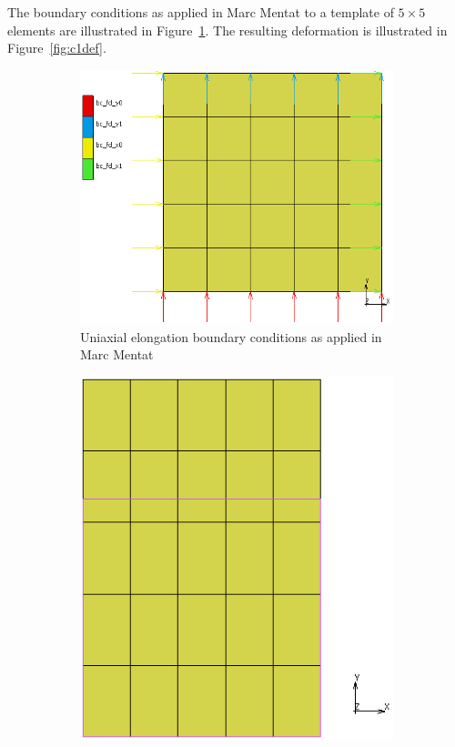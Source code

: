 The boundary conditions as applied in Marc Mentat to a template of $5\times 5$ elements are illustrated in Figure~\ref{fig:c1bc}. The resulting deformation is illustrated in Figure~\ref{fig:c1def}.

\begin{figure}[H]
	\centering
	\begin{subfigure}[b]{0.45\textwidth}
		\centering
		\includegraphics[width=\textwidth]{C1BC.png}
		\caption{Uniaxial elongation boundary conditions as applied in Marc Mentat}
		\label{fig:c1bc}
	\end{subfigure}
	\hfill
	\begin{subfigure}[b]{0.4\textwidth}
		\centering
		\includegraphics[width=\textwidth]{C1Def.png}

\end{subfigure}
\end{figure}
